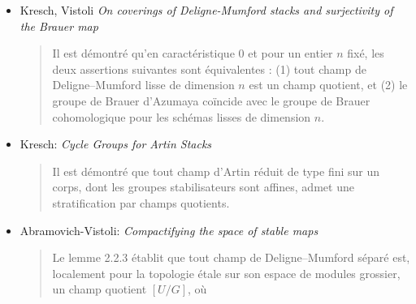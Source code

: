 \begin{itemize}
\begin{quote}
intéressants sur les champs quotients. Il y est démontré que tout champ de
Deligne--Mumford lisse, séparé et génériquement modéré, dont l'espace de modules
grossier est quasi-projectif, est un champ quotient $[Y/G]$, où $Y$ est
quasi-projectif et $G$ un groupe algébrique. Si $\mathcal{X}$ est un champ de
Deligne--Mumford dont l'espace de modules grossier
est un schéma, alors $\mathcal{X}$ est localement pour la topologie de Zariski un
champ quotient si et seulement s'il
admet un recouvrement ouvert de Zariski par des champs quotients de schémas par des
groupes finis. Si $\mathcal{X}$ est un champ de Deligne--Mumford propre sur un corps
de caractéristique 0
et d'espace de modules grossier $Y$, alors les conditions suivantes sont équivalentes :
$Y$ est projectif et $\mathcal{X}$ est un champ quotient; $Y$ est projectif et
$\mathcal{X}$ possède un faisceau générateur; enfin,
$\mathcal{X}$ admet une immersion fermée dans un champ de Deligne--Mumford lisse et
propre dont l'espace de modules grossier est projectif. Cela conduit à dire qu'un
champ de Deligne--Mumford est \emph{projectif} s'il existe une immersion fermée dans
un champ de Deligne--Mumford lisse et propre dont l'espace de modules grossier est projectif.
\end{quote}
\item Kresch, Vistoli \emph{On coverings of Deligne-Mumford stacks and
surjectivity of the Brauer map} \cite{kresch-vistoli}
\begin{quote}
Il est démontré qu'en caractéristique 0 et pour un entier $n$ fixé, les deux
assertions suivantes sont équivalentes : (1) tout champ de Deligne--Mumford lisse de
dimension $n$ est un champ quotient, et (2) le groupe de Brauer d'Azumaya coïncide
avec le groupe de Brauer cohomologique pour les schémas lisses de dimension $n$.
\end{quote}
\item Kresch: \emph{Cycle Groups for Artin Stacks} \cite{kresch_cycle}
\begin{quote}
Il est démontré que tout champ d'Artin réduit de type fini sur un corps, dont les
groupes stabilisateurs sont affines, admet une stratification par champs quotients.
\end{quote}
\item Abramovich-Vistoli:
\emph{Compactifying the space of stable maps} \cite{abramovich-vistoli}
\begin{quote}
Le lemme 2.2.3 établit que tout champ de Deligne--Mumford séparé est, localement pour
la topologie étale sur son espace de modules grossier, un champ quotient $[U/G]$, où

\end{quote}
\end{itemize}
